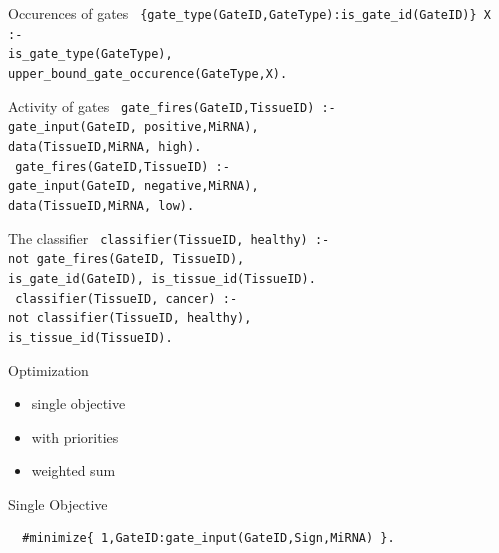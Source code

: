 \documentclass[10pt,dvipsnames]{beamer}
\begin{document}
\begin{frame}{Occurences of gates}
 \texttt{
  \{gate\_type(GateID,GateType):{\color{gray}\;is\_gate\_id(GateID)}\} X :-\\
     \quad is\_gate\_type(GateType),\\
     \quad upper\_bound\_gate\_occurence(GateType,X).
 }
\end{frame}
 

\begin{frame}{Activity of gates}
 \texttt{
 gate\_fires(GateID,TissueID) :-\\
   \quad gate\_input(GateID,{\color{orange} positive},MiRNA),\\
   \quad data(TissueID,MiRNA,{\color{orange} high}).\\
 }
 \vspace{1cm}
 \texttt{
 gate\_fires(GateID,TissueID) :-\\
   \quad gate\_input(GateID,{\color{orange} negative},MiRNA),\\
   \quad data(TissueID,MiRNA,{\color{orange} low}).
 }
\end{frame}

\begin{frame}{The classifier}
 \texttt{
  classifier(TissueID, healthy) :-\\
    \quad not gate\_fires(GateID, TissueID),\\
    \quad is\_gate\_id(GateID), is\_tissue\_id(TissueID).\\
 }
 \vspace{1cm}
 \texttt{
  classifier(TissueID, cancer) :-\\
    \quad not classifier(TissueID, healthy),\\
    \quad is\_tissue\_id(TissueID).
 }
\end{frame}



\begin{frame}{Optimization}
 \begin{itemize}
  \item single objective
  \item with priorities
  \item weighted sum
 \end{itemize}
\end{frame}

\begin{frame}[fragile]{Single Objective}
 \begin{verbatim}
  #minimize{ 1,GateID:gate_input(GateID,Sign,MiRNA) }.
 \end{verbatim}
\end{frame}
\end{document}
